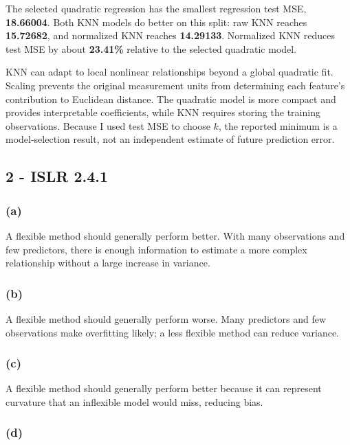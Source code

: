 \documentclass[11pt]{article}
\begin{document}
    The selected quadratic regression has the smallest regression test MSE,
\textbf{18.66004}. Both KNN models do better on this split: raw KNN
reaches \textbf{15.72682}, and normalized KNN reaches \textbf{14.29133}.
Normalized KNN reduces test MSE by about \textbf{23.41\%} relative to
the selected quadratic model.

KNN can adapt to local nonlinear relationships beyond a global quadratic
fit. Scaling prevents the original measurement units from determining
each feature's contribution to Euclidean distance. The quadratic model
is more compact and provides interpretable coefficients, while KNN
requires storing the training observations. Because I used test MSE to
choose \(k\), the reported minimum is a model-selection result, not an
independent estimate of future prediction error.

    \hypertarget{islr-2.4.1}{%
\subsection{2 - ISLR 2.4.1}\label{islr-2.4.1}}

\hypertarget{a}{%
\subsubsection{(a)}\label{a}}

A flexible method should generally perform better. With many
observations and few predictors, there is enough information to estimate
a more complex relationship without a large increase in variance.

\hypertarget{b}{%
\subsubsection{(b)}\label{b}}

A flexible method should generally perform worse. Many predictors and
few observations make overfitting likely; a less flexible method can
reduce variance.

\hypertarget{c}{%
\subsubsection{(c)}\label{c}}

A flexible method should generally perform better because it can
represent curvature that an inflexible model would miss, reducing bias.

\hypertarget{d}{%
\subsubsection{(d)}\label{d}}
\end{document}
